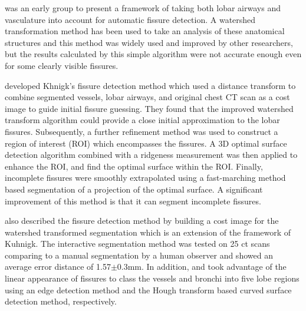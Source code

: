 \cite{kuhnigk2003lung,kuhnigk2005informatics} was an early group to present a framework of taking both lobar airways and vasculature into account for automatic fissure detection. A watershed transformation method has been used to take an analysis of these anatomical structures and this method was widely used and improved by other researchers, but the results calculated by this simple algorithm were not accurate enough even for some clearly visible fissures. 

\cite{ukil2009anatomy} developed Khnigk's fissure detection method which used a distance transform to combine segmented vessels, lobar airways, and original chest CT scan as a cost image to guide initial fissure guessing. They found that the improved watershed transform algorithm could provide a close initial approximation to the lobar fissures. Subsequently, a further refinement method was used to construct a region of interest (ROI) which encompasses the fissures. A 3D optimal surface detection algorithm combined with a ridgeness measurement was then applied to enhance the ROI, and find the optimal surface within the ROI. Finally, incomplete fissures were smoothly extrapolated using a fast-marching method based segmentation of a projection of the optimal surface. A significant improvement of this method is that it can segment incomplete fissures.

\cite{lassen2010automatic} also described the fissure detection method by building a cost image for the watershed transformed segmentation which is an extension of the framework of Kuhnigk. The interactive segmentation method was tested on 25 \gls{ct} scans comparing to a manual segmentation by a human observer and showed an average error distance of 1.57$ \pm $0.3mm. In addition, \cite{zhou2004automatic} and \cite{saita2006algorithm} took advantage of the linear appearance of fissures to class the vessels and bronchi into five lobe regions using an edge detection method and the Hough transform based curved surface detection method, respectively. 

